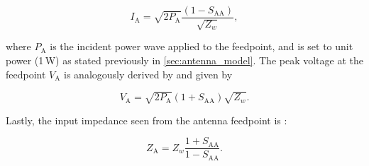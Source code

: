 \begin{equation}
 	I_{\mathrm{A}} = \sqrt{2P_{\mathrm{A}}}\frac{(1-S_{\mathrm{AA}})}{\sqrt{Z_w}},
 	\label{eqn:iin}
\end{equation}
  
where $P_{\mathrm{A}}$ is the incident power wave applied to the feedpoint, and is set to unit power (1\,W) as stated previously in \cref{sec:antenna_model}. The peak voltage at the feedpoint $V_\mathrm{A}$ is analogously derived by \cite[p.~24]{Steer_2015} and given by
 
 \begin{equation}
 	V_{\mathrm{A}} = \sqrt{2P_{\mathrm{A}}}(1+S_{\mathrm{AA}})\sqrt{Z_w}.
 	\label{eqn:vin}
 \end{equation}
 
Lastly, the input impedance seen from the antenna feedpoint is \cite[p.~78]{Steer_2015}:
 
 \begin{equation}
 	Z_{\mathrm{A}}=Z_w\frac{1+S_{\mathrm{AA}}}{1-S_{\mathrm{AA}}}.
 	\label{eqn:za}
 \end{equation}
 
